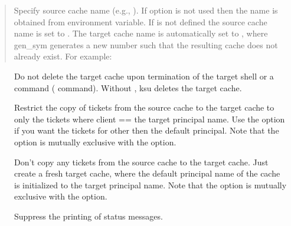 \documentclass[letterpaper,10pt,english]{sphinxmanual}
\begin{document}
\sphinxAtStartPar
{} 
\begin{quote}

\sphinxAtStartPar
Specify source cache name (e.g., ).  If
 option is not used then the name is obtained from
 environment variable.  If  is not
defined the source cache name is set to .
The target cache name is automatically set to , where gen\_sym generates a new number such that
the resulting cache does not already exist.  For example:

\begin{sphinxVerbatim}[commandchars=\\\{\}]
\end{sphinxVerbatim}
\end{quote}
\begin{description}
\item[{}] \leavevmode
\sphinxAtStartPar
Do not delete the target cache upon termination of the target
shell or a command ( command).  Without , ksu deletes
the target cache.

\item[{}] \leavevmode
\sphinxAtStartPar
Restrict the copy of tickets from the source cache to the target
cache to only the tickets where client == the target principal
name.  Use the  option if you want the tickets for other then
the default principal.  Note that the  option is mutually
exclusive with the  option.

\item[{}] \leavevmode
\sphinxAtStartPar
Don’t copy any tickets from the source cache to the target cache.
Just create a fresh target cache, where the default principal name
of the cache is initialized to the target principal name.  Note
that the  option is mutually exclusive with the 
option.

\item[{}] \leavevmode
\sphinxAtStartPar
Suppress the printing of status messages.

\end{description}
\end{document}
